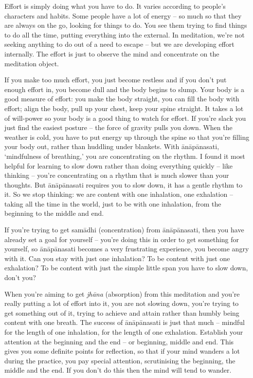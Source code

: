 
Effort is simply doing what you have to do. It varies according to people's characters and habits. Some people have a lot of energy -- so much so that they are always on the go, looking for things to do. You see them trying to find things to do all the time, putting everything into the external. In meditation, we're not seeking anything to do out of a need to escape – but we are developing effort internally. The effort is just to observe the mind and concentrate on the meditation object.

If you make too much effort, you just become restless and if you don't put enough effort in, you become dull and the body begins to slump. Your body is a good measure of effort: you make the body straight, you can fill the body with effort; align the body, pull up your chest, keep your spine straight. It takes a lot of will-power so your body is a good thing to watch for effort. If you're slack you just find the easiest posture -- the force of gravity pulls you down. When the weather is cold, you have to put energy up through the spine so that you're filling your body out, rather than huddling under blankets. With ānāpānasati, `mindfulness of breathing,' you are concentrating on the rhythm. I found it most helpful for learning to slow down rather than doing everything quickly -- like thinking -- you're concentrating on a rhythm that is much slower than your thoughts. But ānāpānasati requires you to slow down, it has a gentle rhythm to it. So we stop thinking: we are content with one inhalation, one exhalation -- taking all the time in the world, just to be with one inhalation, from the beginning to the middle and end.

If you're trying to get samādhi (concentration) from ānāpānasati, then you have already set a goal for yourself -- you're doing this in order to get something for yourself, so ānāpānasati becomes a very frustrating experience, you become angry with it. Can you stay with just one inhalation? To be content with just one exhalation? To be content with just the simple little span you have to slow down, don't you?

When you're aiming to get \textit{jhāna} (absorption) from this meditation and you're really putting a lot of effort into it, you are not slowing down, you're trying to get something out of it, trying to achieve and attain rather than humbly being content with one breath. The success of ānāpānasati is just that much -- mindful for the length of one inhalation, for the length of one exhalation. Establish your attention at the beginning and the end -- or beginning, middle and end. This gives you some definite points for reflection, so that if your mind wanders a lot during the practice, you pay special attention, scrutinising the beginning, the middle and the end. If you don't do this then the mind will tend to wander.

